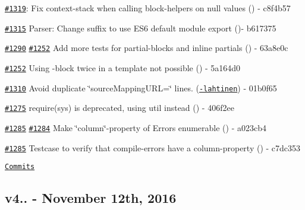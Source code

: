 \begin{DoxyItemize}
\item \href{https://github.com/wycats/handlebars.js/issues/1319}{\tt \#1319}\+: Fix context-\/stack when calling block-\/helpers on null values (\href{https://github.com/nknapp}{\tt }) -\/ c8f4b57
\item \href{https://github.com/wycats/handlebars.js/pull/1315}{\tt \#1315} Parser\+: Change suffix to use E\+S6 default module export (\href{https://github.com/Turbo87}{\tt })-\/ b617375
\item \href{https://github.com/wycats/handlebars.js/pull/1290}{\tt \#1290} \href{https://github.com/wycats/handlebars.js/issue/1290}{\tt \#1252} Add more tests for partial-\/blocks and inline partials (\href{https://github.com/nknapp}{\tt }) -\/ 63a8e0c
\item \href{https://github.com/wycats/handlebars.js/issue/1290}{\tt \#1252} Using -\/block twice in a template not possible (\href{https://github.com/nknapp}{\tt }) -\/ 5a164d0
\item \href{https://github.com/wycats/handlebars.js/pull/1310}{\tt \#1310} Avoid duplicate \char`\"{}source\+Mapping\+U\+R\+L=\char`\"{} lines. (\href{https://github.com/joonas-lahtinen}{\tt -\/lahtinen}) -\/ 01b0f65
\item \href{https://github.com/wycats/handlebars.js/pull/1275}{\tt \#1275} require(\textquotesingle{}sys\textquotesingle{}) is deprecated, using \textquotesingle{}util\textquotesingle{} instead (\href{https://github.com/travnels}{\tt }) -\/ 406f2ee
\item \href{https://github.com/wycats/handlebars.js/pull/1285}{\tt \#1285} \href{https://github.com/wycats/handlebars.js/issues/1284}{\tt \#1284} Make \char`\"{}column\char`\"{}-\/property of Errors enumerable (\href{https://github.com/nknapp}{\tt }) -\/ a023cb4
\item \href{https://github.com/wycats/handlebars.js/pull/1285}{\tt \#1285} Testcase to verify that compile-\/errors have a column-\/property (\href{https://github.com/nknapp}{\tt }) -\/ c7dc353
\end{DoxyItemize}

\href{https://github.com/lawnsea/handlebars.js/compare/v4.0.6...v4.0.7}{\tt Commits}

\subsection*{v4.. -\/ November 12th, 2016}


